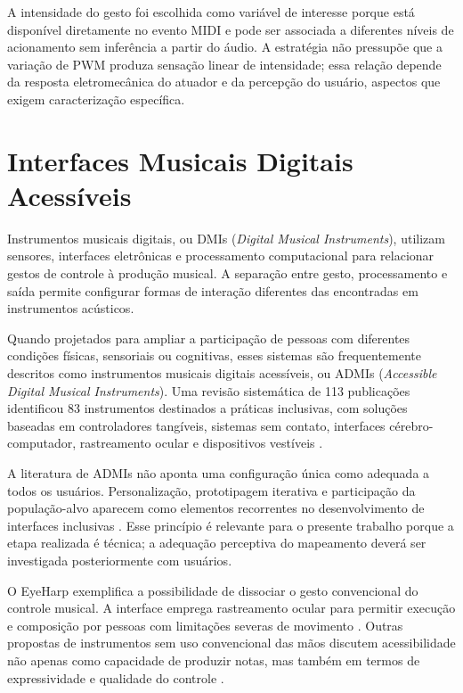 A intensidade do gesto foi escolhida como variável de interesse porque está disponível diretamente no evento MIDI e pode ser associada a diferentes níveis de acionamento sem inferência a partir do áudio. A estratégia não pressupõe que a variação de PWM produza sensação linear de intensidade; essa relação depende da resposta eletromecânica do atuador e da percepção do usuário, aspectos que exigem caracterização específica.

\section{Interfaces Musicais Digitais Acessíveis}

Instrumentos musicais digitais, ou DMIs (\textit{Digital Musical Instruments}), utilizam sensores, interfaces eletrônicas e processamento computacional para relacionar gestos de controle à produção musical. A separação entre gesto, processamento e saída permite configurar formas de interação diferentes das encontradas em instrumentos acústicos.

Quando projetados para ampliar a participação de pessoas com diferentes condições físicas, sensoriais ou cognitivas, esses sistemas são frequentemente descritos como instrumentos musicais digitais acessíveis, ou ADMIs (\textit{Accessible Digital Musical Instruments}). Uma revisão sistemática de 113 publicações identificou 83 instrumentos destinados a práticas inclusivas, com soluções baseadas em controladores tangíveis, sistemas sem contato, interfaces cérebro-computador, rastreamento ocular e dispositivos vestíveis \cite{frid2019}.

A literatura de ADMIs não aponta uma configuração única como adequada a todos os usuários. Personalização, prototipagem iterativa e participação da população-alvo aparecem como elementos recorrentes no desenvolvimento de interfaces inclusivas \cite{frid2019}. Esse princípio é relevante para o presente trabalho porque a etapa realizada é técnica; a adequação perceptiva do mapeamento deverá ser investigada posteriormente com usuários.

O EyeHarp exemplifica a possibilidade de dissociar o gesto convencional do controle musical. A interface emprega rastreamento ocular para permitir execução e composição por pessoas com limitações severas de movimento \cite{vamvakousis2016}. Outras propostas de instrumentos sem uso convencional das mãos discutem acessibilidade não apenas como capacidade de produzir notas, mas também em termos de expressividade e qualidade do controle \cite{davanzo2020}.

